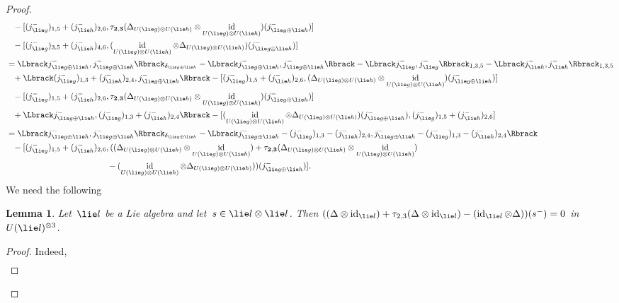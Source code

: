 \documentclass[12pt, reqno]{amsart}
\newcommand{\cybe}[1]{\mathbb{\Lbrack}#1,#1\mathbb{\Rbrack}}
\newcommand{\cyb}[2]{\mathbb{\Lbrack}#1,#2\mathbb{\Rbrack}}
\newtheorem{lemma}[theorem]{Lemma}
\theoremstyle{definition}
\numberwithin{equation}{section}
\newcommand{\tensor}{\otimes}
\DeclareMathOperator{\id}{id}
\begin{document}
\begin{proof}
\begin{align*}
&\phantom{=}
-[( j ^-_{\lie g})_{1,5}+( j ^-_{\lie h})_{2,6},\tau_{\mathbf 2,\mathbf 3}(\Delta_{U(\lie g)\tensor U(\lie h)}\tensor\id_{U(\lie g)\tensor U(\lie h)})( j ^-_{\lie g\oplus\lie h})]\\
&\phantom{=}-[( j ^-_{\lie g})_{3,5}+( j ^-_{\lie h})_{4,6},(\id_{U(\lie g)\tensor U(\lie h)}\tensor\Delta_{U(\lie g)\tensor U(\lie h)})( j ^-_{\lie g\oplus\lie h})]\\
&=\cybe{ j ^-_{\lie g\oplus\lie h}}_{\delta_{\lie g\oplus\lie h}}-
\cybe{ j ^-_{\lie g\oplus\lie h}}
-\cybe{ j ^-_{\lie g}}_{1,3,5}-\cybe{ j ^-_{\lie h}}_{1,3,5}\\
&\phantom{=}
+\cyb{( j ^-_{\lie g})_{1,3}+( j ^-_{\lie h})_{2,4}}{ j ^-_{\lie g\oplus\lie h}}-
[( j ^-_{\lie g})_{1,5}+( j ^-_{\lie h})_{2,6},(\Delta_{U(\lie g)\tensor U(\lie h)}\tensor\id_{U(\lie g)\tensor U(\lie h)})( j ^-_{\lie g\oplus\lie h})]\\
&\phantom{=}
-[( j ^-_{\lie g})_{1,5}+( j ^-_{\lie h})_{2,6},\tau_{\mathbf 2,\mathbf 3}(\Delta_{U(\lie g)\tensor U(\lie h)}\tensor\id_{U(\lie g)\tensor U(\lie h)})( j ^-_{\lie g\oplus\lie h})]\\
&\phantom{=}+\cyb{ j ^-_{\lie g\oplus\lie h}}{( j ^-_{\lie g})_{1,3}+( j ^-_{\lie h})_{2,4}}-[(\id_{U(\lie g)\tensor U(\lie h)}\tensor\Delta_{U(\lie g)\tensor U(\lie h)})( j ^-_{\lie g\oplus\lie h}),( j ^-_{\lie g})_{1,5}+( j ^-_{\lie h})_{2,6}]\\
&=\cybe{ j ^-_{\lie g\oplus\lie h}}_{\delta_{\lie g\oplus\lie h}}-
\cybe{ j ^-_{\lie g\oplus\lie h}-( j ^-_{\lie g})_{1,3}-( j ^-_{\lie h})_{2,4}}\\
&\phantom{=}-[( j ^-_{\lie g})_{1,5}+( j ^-_{\lie h})_{2,6},((\Delta_{U(\lie g)\tensor U(\lie h)}\tensor\id_{U(\lie g)\tensor U(\lie h)})
+\tau_{\mathbf 2,\mathbf 3}(\Delta_{U(\lie g)\tensor U(\lie h)}\tensor\id_{U(\lie g)\tensor U(\lie h)})\\
&\phantom{=-[( j ^-_{\lie g})_{1,5}+( j ^-_{\lie h})_{2,6},}-(\id_{U(\lie g)\tensor U(\lie h)}\tensor\Delta_{U(\lie g)\tensor U(\lie h)}))
( j ^-_{\lie g\oplus\lie h})].
\end{align*}
We need the following
\begin{lemma}
Let~$\lie l$ be a Lie algebra and let~$s\in\lie l\tensor\lie l$.
Then $((\Delta\tensor\id_{\lie l})+\tau_{2,3}(\Delta\tensor\id_{\lie l})
-(\id_{\lie l}\tensor\Delta))(s^-)=0$ in~$U(\lie l)^{\tensor 3}$.
\end{lemma}
\begin{proof}
Indeed, 
\begin{align*}

\end{align*}
\end{proof}
\end{proof}
\end{document}
